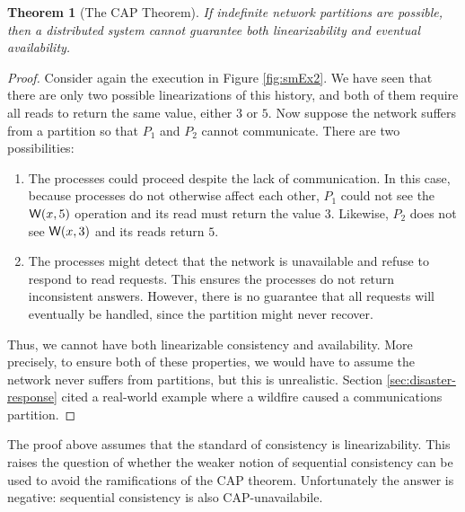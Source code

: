 \documentclass[]             %
{NASA}                       %
\newtheorem{theorem}{Theorem}[section]
\theoremstyle{definition}
\begin{document}
\begin{theorem}[The CAP Theorem]
  \label{thm:cap}
  If indefinite network partitions are possible, then a distributed
  system cannot guarantee both linearizability and
  eventual availability.
\end{theorem}
\begin{proof}
  Consider again the execution in Figure \ref{fig:smEx2}. We have seen
  that there are only two possible linearizations of this history, and
  both of them require all reads to return the same value, either $3$
  or $5$. Now suppose the network suffers from a partition so that
  $P_1$ and $P_2$ cannot communicate. There are two possibilities:
  \begin{enumerate}
  \item The processes could proceed despite the lack of
    communication. In this case, because processes do not otherwise
    affect each other, $P_1$ could not see the $\mathsf{W}\!\left(x, 5\right)$
    operation and its read must return the value $3$. Likewise, $P_2$
    does not see $\mathsf{W}\!\left(x, 3\right)$ and its reads return $5$.
  \item The processes might detect that the network is unavailable and
    refuse to respond to read requests. This ensures the processes do
    not return inconsistent answers. However, there is no guarantee
    that all requests will eventually be handled, since the partition
    might never recover.
  \end{enumerate}

  Thus, we cannot have both linearizable consistency and
  availability. More precisely, to ensure both of these properties, we
  would have to assume the network never suffers from partitions, but
  this is unrealistic. Section \ref{sec:disaster-response} cited a
  real-world example where a wildfire caused a communications
  partition.
\end{proof}


The proof above assumes that the standard of consistency is
linearizability. This raises the question of whether the weaker notion
of sequential consistency can be used to avoid the ramifications of
the CAP theorem. Unfortunately the answer is negative: sequential
consistency is also CAP-unavailabile.
\end{document}
